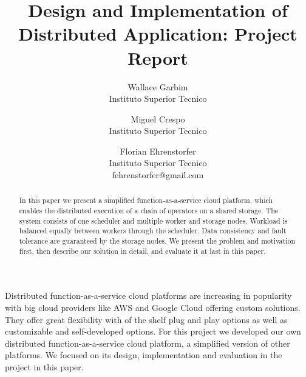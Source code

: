 \documentclass[times, 10pt,twocolumn]{article}
\begin{document}
\title{Design and Implementation of Distributed Application: Project Report}

\author{
Wallace Garbim\\Instituto Superior Tecnico\\
\and
Miguel Crespo\\Instituto Superior Tecnico\\
\and
Florian Ehrenstorfer\\
Instituto Superior Tecnico\\fehrenstorfer@gmail.com\\
}

\maketitle
\thispagestyle{empty}

\begin{abstract}
In this paper we present a simplified function-as-a-service cloud platform, which enables the distributed execution of a chain of operators on a shared storage. 
The system consists of one scheduler and multiple worker and storage nodes.
Workload is balanced equally between workers through the scheduler.
Data consistency and fault tolerance are guaranteed by the storage nodes.
We present the problem and motivation first, then describe our solution in detail, and evaluate it at last in this paper.
\end{abstract}
Distributed function-as-a-service cloud platforms are increasing in popularity with big cloud providers like AWS and Google Cloud offering custom solutions.
They offer great flexibility with of the shelf plug and play options as well as customizable and self-developed options.
For this project we developed our own distributed function-as-a-service cloud platform, a simplified version of other platforms.
We focused on its design, implementation and evaluation in the project in this paper.











\nocite{ex1,ex2}


\end{document}
